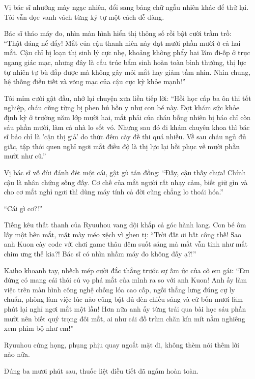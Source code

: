 \documentclass[../main.tex]{subfiles}
\begin{document}
Vị bác sĩ nhướng mày ngạc nhiên, đổi sang bảng chữ ngẫu nhiên khác để thử lại. Tôi vẫn đọc vanh vách từng ký tự một cách dễ dàng.

Bác sĩ tháo máy đo, nhìn màn hình hiển thị thông số rồi bật cười trầm trồ: ``Thật đáng nể đấy! Mắt của cậu thanh niên này đạt mười phần mười ở cả hai mắt. Cậu chỉ bị loạn thị sinh lý cực nhẹ, khoảng không phẩy hai lăm đi-ốp ở trục ngang giác mạc, nhưng đây là cấu trúc bẩm sinh hoàn toàn bình thường, thị lực tự nhiên tự bù đắp được mà không gây mỏi mắt hay giảm tầm nhìn. Nhìn chung, hệ thống điều tiết và võng mạc của cậu cực kỳ khỏe mạnh!''

Tôi mỉm cười gật đầu, nhớ lại chuyện xưa liền tiếp lời: ``Hồi học cấp ba ôn thi tốt nghiệp, cháu cũng từng bị phen hú hồn y như con bé này. Đợt khám sức khỏe định kỳ ở trường năm lớp mười hai, mắt phải của cháu bỗng nhiên bị báo chỉ còn sáu phần mười, làm cả nhà lo sốt vó. Nhưng sau đó đi khám chuyên khoa thì bác sĩ bảo chỉ là 'cận thị giả' do thức đêm cày đề thi quá nhiều. Về sau cháu ngủ đủ giấc, tập thói quen nghỉ ngơi mắt điều độ là thị lực lại hồi phục về mười phần mười như cũ.''

Vị bác sĩ vỗ đùi đánh đét một cái, gật gù tán đồng: ``Đấy, cậu thấy chưa! Chính cậu là nhân chứng sống đấy. Cơ chế của mắt người rất nhạy cảm, biết giữ gìn và cho cơ mắt nghỉ ngơi thì dùng máy tính cả đời cũng chẳng lo thoái hóa.''

``Cái gì cơ?!''

Tiếng kêu thất thanh của Ryuuhou vang dội khắp cả góc hành lang. Con bé ôm lấy một bên mắt, mặt mày méo xệch vì ghen tị: ``Trời đất ơi bất công thế! Sao anh Kuon cày code với chơi game thâu đêm suốt sáng mà mắt vẫn tinh như mắt chim ưng thế kia?! Bác sĩ có nhìn nhầm máy đo không đấy ạ?!''

Kaiho khoanh tay, nhếch mép cười đắc thắng trước sự ấm ức của cô em gái: ``Em đừng có mang cái thói cú vọ phá mắt của mình ra so với anh Kuon! Anh ấy làm việc trên màn hình công nghệ chống lóa cao cấp, ngồi thẳng lưng đúng cự ly chuẩn, phòng làm việc lúc nào cũng bật đủ đèn chiếu sáng và cứ bốn mươi lăm phút lại nghỉ ngơi mắt một lần! Hơn nữa anh ấy từng trải qua bài học sáu phần mười nên biết quý trọng đôi mắt, ai như cái đồ trùm chăn kín mít nằm nghiêng xem phim bộ như em!''

Ryuuhou cứng họng, phụng phịu quay ngoắt mặt đi, không thèm nói thêm lời nào nữa.

\ct

Đúng ba mươi phút sau, thuốc liệt điều tiết đã ngấm hoàn toàn.
\end{document}
